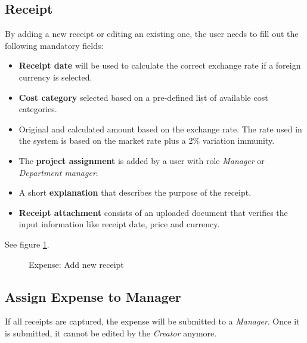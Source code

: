 \subsection*{Receipt}
\label{sec:addreceipt}
By adding a new receipt or editing an existing one, the user needs to fill out the following mandatory fields:
\begin{itemize}
    \item \textbf{Receipt date} will be used to calculate the correct exchange rate if a foreign currency is selected.
    \item \textbf{Cost category} selected based on a pre-defined list of available cost categories.
    \item Original and calculated amount based on the exchange rate. The rate used in the system is based on the market rate plus a 2\% variation immunity.

    \item The \textbf{project assignment} is added by a user with role \textit{Manager} or \textit{Department manager}.
    \item A short \textbf{explanation} that describes the purpose of the receipt.
    \item \textbf{Receipt attachment} consists of an uploaded document that verifies the input information like receipt date, price and currency.
\end{itemize}

See figure \ref{fig:expenses-add01}.


\begin{figure}[H]
    \centering
    \caption{Expense: Add new receipt}
    \label{fig:expenses-add01}
\end{figure}

\subsection*{Assign Expense to Manager}
If all receipts are captured, the expense will be submitted to a \textit{Manager}. Once it is submitted, it cannot be edited by the \textit{Creator} anymore.

